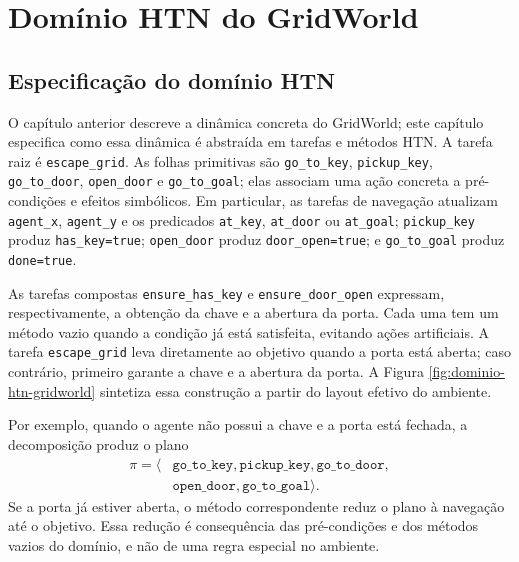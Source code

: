 \chapter{Domínio HTN do GridWorld}

\section{Especificação do domínio HTN}

O capítulo anterior descreve a dinâmica concreta do GridWorld; este capítulo
especifica como essa dinâmica é abstraída em tarefas e métodos HTN. A tarefa
raiz é \texttt{escape\_grid}. As folhas primitivas são
\texttt{go\_to\_key}, \texttt{pickup\_key}, \texttt{go\_to\_door},
\texttt{open\_door} e \texttt{go\_to\_goal}; elas associam uma ação concreta
a pré-condições e efeitos simbólicos. Em particular, as tarefas de navegação
atualizam \texttt{agent\_x}, \texttt{agent\_y} e os predicados
\texttt{at\_key}, \texttt{at\_door} ou \texttt{at\_goal};
\texttt{pickup\_key} produz \texttt{has\_key=true};
\texttt{open\_door} produz \texttt{door\_open=true}; e
\texttt{go\_to\_goal} produz \texttt{done=true}.

As tarefas compostas \texttt{ensure\_has\_key} e
\texttt{ensure\_door\_open} expressam, respectivamente, a obtenção da chave e
a abertura da porta. Cada uma tem um método vazio quando a condição já está
satisfeita, evitando ações artificiais. A tarefa \texttt{escape\_grid} leva
diretamente ao objetivo quando a porta está aberta; caso contrário, primeiro
garante a chave e a abertura da porta. A Figura
\ref{fig:dominio-htn-gridworld} sintetiza essa construção a partir do layout efetivo
do ambiente.



Por exemplo, quando o agente não possui a chave e a porta está fechada, a
decomposição produz o plano
\begin{equation}
\begin{aligned}
\pi = \langle {} &\texttt{go\_to\_key},\texttt{pickup\_key},
\texttt{go\_to\_door},\\
&\texttt{open\_door},\texttt{go\_to\_goal} \rangle.
\end{aligned}
\end{equation}
Se a porta já estiver aberta, o método correspondente reduz o plano à navegação
até o objetivo. Essa redução é consequência das pré-condições e dos métodos
vazios do domínio, e não de uma regra especial no ambiente.

